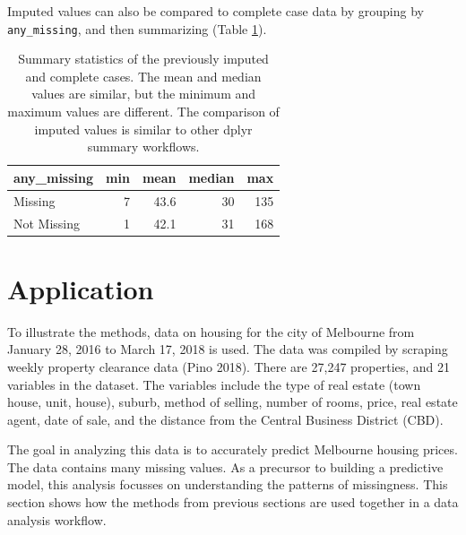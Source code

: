 \documentclass[]{article}
\newenvironment{Shaded}{\begin{snugshade}}{\end{snugshade}}
\newcommand{\DataTypeTok}[1]{\textcolor[rgb]{0.13,0.29,0.53}{#1}}
\newcommand{\KeywordTok}[1]{\textcolor[rgb]{0.13,0.29,0.53}{\textbf{#1}}}
\newcommand{\NormalTok}[1]{#1}
\newcommand{\OperatorTok}[1]{\textcolor[rgb]{0.81,0.36,0.00}{\textbf{#1}}}
\newcommand{\StringTok}[1]{\textcolor[rgb]{0.31,0.60,0.02}{#1}}
\theoremstyle{definition}
\theoremstyle{definition}
\theoremstyle{definition}
\theoremstyle{remark}
\begin{document}
Imputed values can also be compared to complete case data by grouping by
\texttt{any\_missing}, and then summarizing (Table
\ref{tab:impute-summary}).

\begin{Shaded}
\end{Shaded}

\begin{table}[!h]

\caption{\label{tab:impute-summary}Summary statistics of the previously imputed and complete cases. The mean and median values are similar, but the minimum and maximum values are different. The comparison of imputed values is similar to other dplyr summary workflows.}
\centering
\begin{tabular}[t]{lrrrr}
\toprule
any\_missing & min & mean & median & max\\
\midrule
Missing & 7 & 43.6 & 30 & 135\\
Not Missing & 1 & 42.1 & 31 & 168\\
\bottomrule
\end{tabular}
\end{table}

\hypertarget{case-study}{%
\section{Application}\label{case-study}}

To illustrate the methods, data on housing for the city of Melbourne
from January 28, 2016 to March 17, 2018 is used. The data was compiled
by scraping weekly property clearance data (Pino 2018). There are 27,247
properties, and 21 variables in the dataset. The variables include the
type of real estate (town house, unit, house), suburb, method of
selling, number of rooms, price, real estate agent, date of sale, and
the distance from the Central Business District (CBD).

The goal in analyzing this data is to accurately predict Melbourne
housing prices. The data contains many missing values. As a precursor to
building a predictive model, this analysis focusses on understanding the
patterns of missingness. This section shows how the methods from
previous sections are used together in a data analysis workflow.
\end{document}
